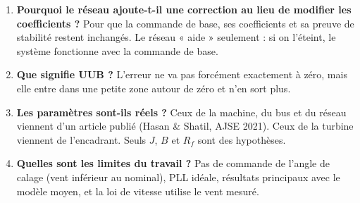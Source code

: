\documentclass[11pt,a4paper]{article}
\begin{document}
\begin{enumerate}
\item \textbf{Pourquoi le réseau ajoute-t-il une correction au lieu de modifier les coefficients ?}
Pour que la commande de base, ses coefficients et sa preuve de stabilité restent inchangés. Le réseau
« aide » seulement : si on l'éteint, le système fonctionne avec la commande de base.

\item \textbf{Que signifie UUB ?}
L'erreur ne va pas forcément exactement à zéro, mais elle entre dans une petite zone autour de zéro et n'en sort plus.

\item \textbf{Les paramètres sont-ils réels ?}
Ceux de la machine, du bus et du réseau viennent d'un article publié (Hasan \& Shatil, AJSE 2021). Ceux de
la turbine viennent de l'encadrant. Seuls $J$, $B$ et $R_f$ sont des hypothèses.

\item \textbf{Quelles sont les limites du travail ?}
Pas de commande de l'angle de calage (vent inférieur au nominal), PLL idéale, résultats principaux avec le
modèle moyen, et la loi de vitesse utilise le vent mesuré.
\end{enumerate}

\end{document}
